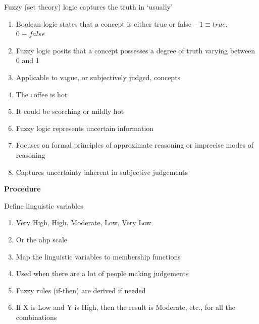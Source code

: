 \documentclass[aspectratio=1610,pdftex,dvipsnames,compress,xcolor={dvipsnames}]{beamer}
\newcommand{\acs}{\acrshort} %
\begin{document}
\addtocounter{framenumber}{-1}
\begin{frame}{Fuzzy (set theory) logic captures the truth in `usually'}
    \begin{enumerate}[series=outerlist,topsep=0pt,itemsep=15pt,leftmargin=*,label=(\arabic*)]
        \item[]Boolean logic states that a concept is either true or false -- $1 \equiv true$, $0 \equiv false$
        \item[]Fuzzy logic posits that a concept possesses a degree of truth varying between 0 and 1 
        \item[]Applicable to vague, or subjectively judged, concepts
        \item[]The coffee is hot
        \item[]It could be scorching or mildly hot
        \item[]Fuzzy logic represents uncertain information
        \item[]Focuses on formal principles of approximate reasoning or imprecise modes of reasoning
        \item[]Captures uncertainty inherent in subjective judgements
    \end{enumerate}
\end{frame}


\begin{frame}[plain]{}
    \centering\LARGE\textbf{Procedure}
\end{frame}


\addtocounter{framenumber}{-1}
\begin{frame}{Define linguistic variables}
    \begin{enumerate}[series=outerlist,topsep=0pt,itemsep=15pt,leftmargin=*,label=(\arabic*)]
        \item[]Very High, High, Moderate, Low, Very Low
        \item[]Or the \acs{ahp} scale
        \item[]Map the linguistic variables to membership functions
        \item[]Used when there are a lot of people making judgements 
        \item[]Fuzzy rules (if-then) are derived if needed
        \item[]If X is Low and Y is High, then the result is Moderate, etc., for all the combinations
    \end{enumerate}
\end{frame}
\end{document}
